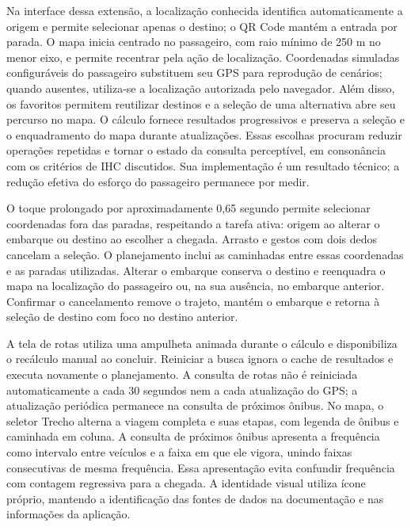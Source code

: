 \documentclass[12pt,oneside,a4paper,brazil,chapter=TITLE]{abntex2}
\begin{document}
Na interface dessa extensão, a localização conhecida identifica automaticamente a origem e permite selecionar apenas o destino; o QR Code mantém a entrada por parada. O mapa inicia centrado no passageiro, com raio mínimo de 250 m no menor eixo, e permite recentrar pela ação de localização. Coordenadas simuladas configuráveis do passageiro substituem seu GPS para reprodução de cenários; quando ausentes, utiliza-se a localização autorizada pelo navegador. Além disso, os favoritos permitem reutilizar destinos e a seleção de uma alternativa abre seu percurso no mapa. O cálculo fornece resultados progressivos e preserva a seleção e o enquadramento do mapa durante atualizações. Essas escolhas procuram reduzir operações repetidas e tornar o estado da consulta perceptível, em consonância com os critérios de IHC discutidos. Sua implementação é um resultado técnico; a redução efetiva do esforço do passageiro permanece por medir.


O toque prolongado por aproximadamente 0,65 segundo permite selecionar coordenadas fora das paradas, respeitando a tarefa ativa: origem ao alterar o embarque ou destino ao escolher a chegada. Arrasto e gestos com dois dedos cancelam a seleção. O planejamento inclui as caminhadas entre essas coordenadas e as paradas utilizadas. Alterar o embarque conserva o destino e reenquadra o mapa na localização do passageiro ou, na sua ausência, no embarque anterior. Confirmar o cancelamento remove o trajeto, mantém o embarque e retorna à seleção de destino com foco no destino anterior.

A tela de rotas utiliza uma ampulheta animada durante o cálculo e disponibiliza o recálculo manual ao concluir. Reiniciar a busca ignora o cache de resultados e executa novamente o planejamento. A consulta de rotas não é reiniciada automaticamente a cada 30 segundos nem a cada atualização do GPS; a atualização periódica permanece na consulta de próximos ônibus. No mapa, o seletor Trecho alterna a viagem completa e suas etapas, com legenda de ônibus e caminhada em coluna. A consulta de próximos ônibus apresenta a frequência como intervalo entre veículos e a faixa em que ele vigora, unindo faixas consecutivas de mesma frequência. Essa apresentação evita confundir frequência com contagem regressiva para a chegada. A identidade visual utiliza ícone próprio, mantendo a identificação das fontes de dados na documentação e nas informações da aplicação.
\end{document}
